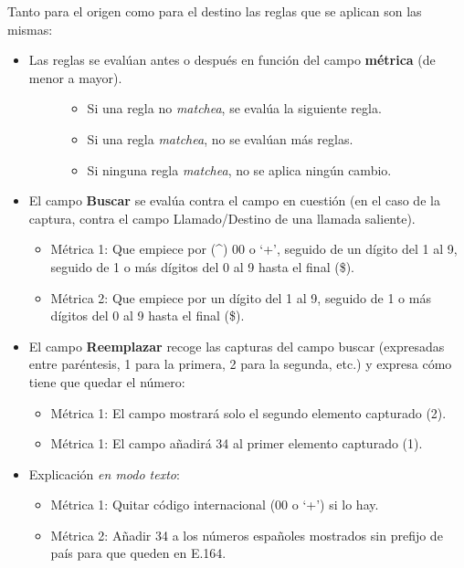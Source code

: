 \documentclass[letterpaper,10pt,spanish]{sphinxmanual}
\begin{document}
Tanto para el origen como para el destino las reglas que se aplican son las mismas:

\noindent{}
\begin{itemize}
\item {} \begin{description}
\item[{Las reglas se evalúan antes o después en función del campo \textbf{métrica} (de menor a mayor).}] \leavevmode\begin{itemize}
\item {} 
Si una regla no \emph{matchea}, se evalúa la siguiente regla.

\item {} 
Si una regla \emph{matchea}, no se evalúan más reglas.

\item {} 
Si ninguna regla \emph{matchea}, no se aplica ningún cambio.

\end{itemize}

\end{description}

\item {} 
El campo \textbf{Buscar} se evalúa contra el campo en cuestión (en el caso de la captura, contra el campo Llamado/Destino de una llamada saliente).
\begin{itemize}
\item {} 
Métrica 1: Que empiece por (\textasciicircum{}) 00 o `+', seguido de un dígito del 1 al 9, seguido de 1 o más dígitos del 0 al 9 hasta el final (\$).

\item {} 
Métrica 2: Que empiece por un dígito del 1 al 9, seguido de 1 o más dígitos del 0 al 9 hasta el final (\$).

\end{itemize}

\item {} 
El campo \textbf{Reemplazar} recoge las capturas del campo buscar (expresadas entre paréntesis, 1 para la primera, 2 para la segunda, etc.) y expresa cómo tiene que quedar el número:
\begin{itemize}
\item {} 
Métrica 1: El campo mostrará solo el segundo elemento capturado (2).

\item {} 
Métrica 1: El campo añadirá 34 al primer elemento capturado (1).

\end{itemize}

\item {} 
Explicación \emph{en modo texto}:
\begin{itemize}
\item {} 
Métrica 1: Quitar código internacional (00 o `+') si lo hay.

\item {} 
Métrica 2: Añadir 34 a los números españoles mostrados sin prefijo de país para que queden en E.164.

\end{itemize}

\end{itemize}
\end{document}
